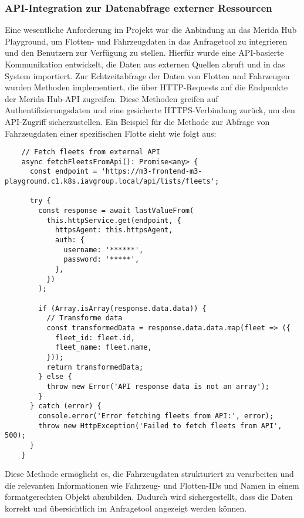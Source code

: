 \subsubsection*{API-Integration zur Datenabfrage externer Ressourcen}
Eine wesentliche Anforderung im Projekt war die Anbindung an das Merida Hub Playground, um Flotten- und Fahrzeugdaten in das Anfragetool zu integrieren und den Benutzern zur Verfügung zu stellen. Hierfür wurde eine API-basierte Kommunikation entwickelt, die Daten aus externen Quellen abruft und in das System importiert.
\newline
Zur Echtzeitabfrage der Daten von Flotten und Fahrzeugen wurden Methoden implementiert, die über HTTP-Requests auf die Endpunkte der Merida-Hub-API zugreifen. Diese Methoden greifen auf Authentifizierungsdaten und eine gesicherte HTTPS-Verbindung zurück, um den API-Zugriff sicherzustellen.
\newline
Ein Beispiel für die Methode zur Abfrage von Fahrzeugdaten einer spezifischen Flotte sieht wie folgt aus:

\begin{lstlisting}
    // Fetch fleets from external API
    async fetchFleetsFromApi(): Promise<any> {
      const endpoint = 'https://m3-frontend-m3-playground.c1.k8s.iavgroup.local/api/lists/fleets';
   
      try {
        const response = await lastValueFrom(
          this.httpService.get(endpoint, {
            httpsAgent: this.httpsAgent,
            auth: {
              username: '******',
              password: '*****',
            },
          })
        );
   
        if (Array.isArray(response.data.data)) {
          // Transforme data
          const transformedData = response.data.data.map(fleet => ({
            fleet_id: fleet.id,
            fleet_name: fleet.name,
          }));
          return transformedData;
        } else {
          throw new Error('API response data is not an array');
        }
      } catch (error) {
        console.error('Error fetching fleets from API:', error);
        throw new HttpException('Failed to fetch fleets from API', 500);
      }
    }
\end{lstlisting}
Diese Methode ermöglicht es, die Fahrzeugdaten strukturiert zu verarbeiten und die relevanten Informationen wie Fahrzeug- und Flotten-IDs und Namen in einem formatgerechten Objekt abzubilden. Dadurch wird sichergestellt, dass die Daten korrekt und übersichtlich im Anfragetool angezeigt werden können.
